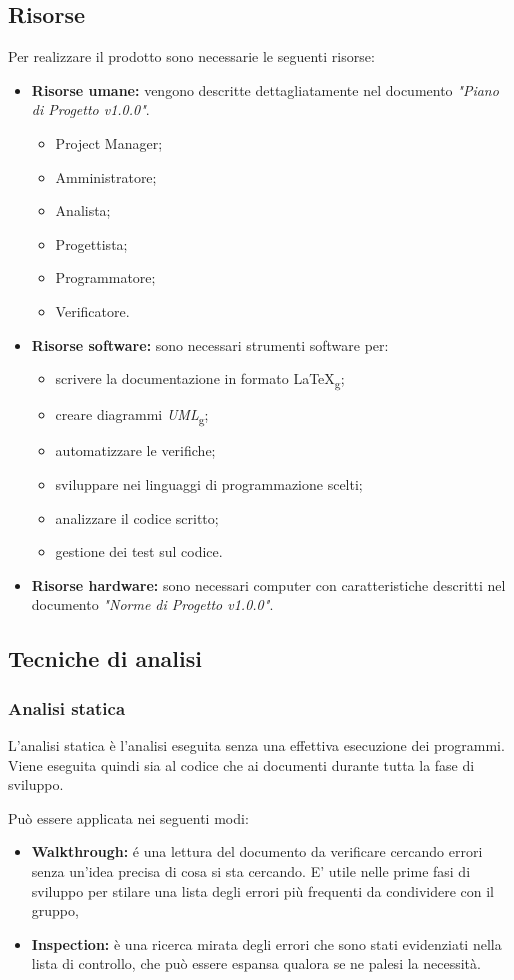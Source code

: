 \documentclass[12pt,a4paper,titlepage]{article}
\begin{document}
	\subsection{Risorse}
	Per realizzare il prodotto sono necessarie le seguenti risorse:
	\begin{itemize}
		\item \textbf{Risorse umane:} vengono descritte dettagliatamente nel documento \textit{"Piano di Progetto v1.0.0"}.
		\begin{itemize}
			\item Project Manager;
			\item Amministratore;
			\item Analista;
			\item Progettista;
			\item Programmatore;
			\item Verificatore.
		\end{itemize}
		\item \textbf{Risorse software:} sono necessari strumenti software per:
		\begin{itemize}
			\item scrivere la documentazione in formato \LaTeX\textsubscript{g};
			\item creare diagrammi \textit{UML}\textsubscript{g};
			\item automatizzare le verifiche;
			\item sviluppare nei linguaggi di programmazione scelti;
			\item analizzare il codice scritto;
			\item gestione dei test sul codice.
		\end{itemize}
		\item \textbf{Risorse hardware:} sono necessari computer con caratteristiche descritti nel documento \textit{"Norme di Progetto v1.0.0"}. 
	\end{itemize}
	\subsection{Tecniche di analisi}
		\subsubsection{Analisi statica}
		L'analisi statica è l'analisi eseguita senza una effettiva esecuzione dei programmi. Viene eseguita quindi sia al codice che ai documenti durante tutta la fase di sviluppo. 
		
		Può essere applicata nei seguenti modi:
		\begin{itemize}
			\item \textbf{Walkthrough:} é una lettura del documento da verificare cercando errori senza un'idea precisa di cosa si sta cercando. E' utile nelle prime fasi di sviluppo per stilare una lista degli errori più frequenti da condividere con il gruppo,
			\item \textbf{Inspection:} è una ricerca mirata degli errori che sono stati evidenziati nella lista di controllo, che può essere espansa qualora se ne palesi la necessità.
		\end{itemize}
\end{document}
